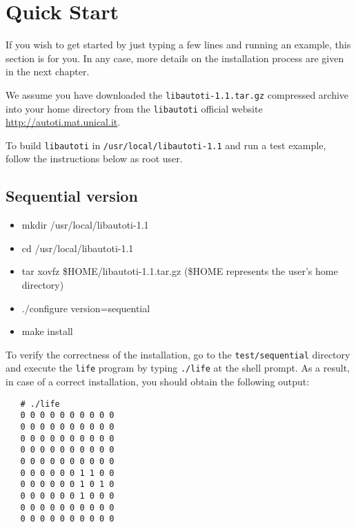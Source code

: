 \chapter{Quick Start}

If you wish to get started by just typing a few lines and running
an example, this section is for you. In any case, more details on
the installation process are given in the next chapter.

We assume you have downloaded the \verb"libautoti-1.1.tar.gz"
compressed archive into your home directory from the
\verb"libautoti" official website
\url{http://autoti.mat.unical.it}.

To build \verb"libautoti" in \verb"/usr/local/libautoti-1.1" and
run a test example, follow the instructions below as root user.


\section{Sequential version}

\begin{itemize}

    \item mkdir /usr/local/libautoti-1.1

    \item cd /usr/local/libautoti-1.1

    \item tar xovfz \$HOME/libautoti-1.1.tar.gz (\$HOME
represents the user's home directory)

    \item ./configure version=sequential

    \item make install

\end{itemize}


To verify the correctness of the installation, go to the
\verb"test/sequential" directory and execute the \verb"life"
program by typing \verb"./life" at the shell prompt. As a result,
in case of a correct installation, you should obtain the following
output:

\begin{verbatim}
   # ./life
   0 0 0 0 0 0 0 0 0 0
   0 0 0 0 0 0 0 0 0 0
   0 0 0 0 0 0 0 0 0 0
   0 0 0 0 0 0 0 0 0 0
   0 0 0 0 0 0 0 0 0 0
   0 0 0 0 0 0 1 1 0 0
   0 0 0 0 0 0 1 0 1 0
   0 0 0 0 0 0 1 0 0 0
   0 0 0 0 0 0 0 0 0 0
   0 0 0 0 0 0 0 0 0 0
\end{verbatim}

